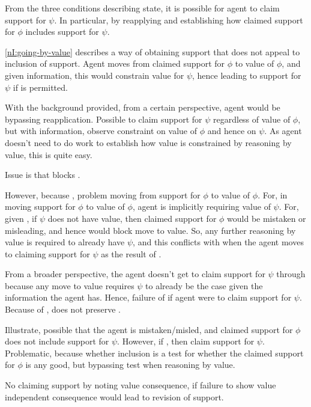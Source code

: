 \begin{note}
  From the three conditions describing state, it is possible for agent to claim support for \(\psi\).
  In particular, by reapplying and establishing how claimed support for \(\phi\) includes support for \(\psi\).

  \ref{nI:going-by-value} describes a way of obtaining support that does not appeal to inclusion of support.
  Agent moves from claimed support for \(\phi\) to value of \(\phi\), and given information, this would constrain value for \(\psi\), hence leading to support for \(\psi\) if \RBV{} is permitted.

  With the background provided, from a certain perspective, agent would be bypassing reapplication.
  Possible to claim support for \(\psi\) regardless of value of \(\phi\), but with information, observe constraint on value of \(\phi\) and hence on \(\psi\).
  As agent doesn't need to do work to establish how value is constrained by reasoning by value, this is quite easy.

  Issue is that \incl{} blocks \RBV{}.
  
  However, because \incl{}, problem moving from support for \(\phi\) to value of \(\phi\).
  For, in moving support for \(\phi\) to value of \(\phi\), agent is implicitly requiring value of \(\psi\).
  For, given \incl{}, if \(\psi\) does not have value, then claimed support for \(\phi\) would be mistaken or misleading, and hence would block move to value.
  So, any further reasoning by value is required to already have \(\psi\), and this conflicts with \eiS{} when the agent moves to claiming support for \(\psi\) as the result of \RBV{}.

  From a broader perspective, the agent doesn't get to claim support for \(\psi\) through \RBV{} because any move to value requires \(\psi\) to already be the case given the information the agent has.
  Hence, failure of \eiS{} if agent were to claim support for \(\psi\).
  Because of \incl{}, \RBV{} does not preserve \eiS{}.

  Illustrate, possible that the agent is mistaken/misled, and claimed support for \(\phi\) does not include support for \(\psi\).
  However, if \RBV{}, then claim support for \(\psi\).
  Problematic, because whether inclusion is a test for whether the claimed support for \(\phi\) is any good, but bypassing test when reasoning by value.

  No claiming support by noting value consequence, if failure to show value independent consequence would lead to revision of support.
\end{note}

